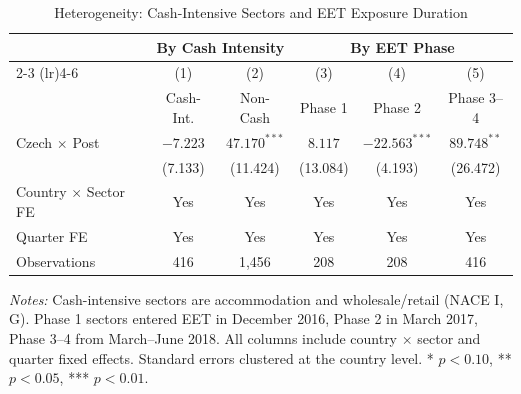 
\begin{table}[H]
\centering
\caption{Heterogeneity: Cash-Intensive Sectors and EET Exposure Duration}
\label{tab:hetero}
\begin{threeparttable}
\begin{tabular}{lccccc}
\toprule
 & \multicolumn{2}{c}{By Cash Intensity} & \multicolumn{3}{c}{By EET Phase} \\
\cmidrule(lr){2-3} \cmidrule(lr){4-6}
 & (1) & (2) & (3) & (4) & (5) \\
 & {Cash-Int.} & {Non-Cash} & {Phase 1} & {Phase 2} & {Phase 3--4} \\
\midrule
Czech $\times$ Post & $-7.223$ & $47.170^{***}$ & $8.117$ & $-22.563^{***}$ & $89.748^{**}$ \\
 & (7.133) & (11.424) & (13.084) & (4.193) & (26.472) \\
\midrule
Country $\times$ Sector FE & Yes & Yes & Yes & Yes & Yes \\
Quarter FE & Yes & Yes & Yes & Yes & Yes \\
Observations & 416 & 1,456 & 208 & 208 & 416 \\
\bottomrule
\end{tabular}
\begin{tablenotes}[flushleft]
\small
\item \textit{Notes:} Cash-intensive sectors are accommodation and wholesale/retail (NACE I, G). Phase 1 sectors entered EET in December 2016, Phase 2 in March 2017, Phase 3--4 from March--June 2018. All columns include country $\times$ sector and quarter fixed effects. Standard errors clustered at the country level. * $p<0.10$, ** $p<0.05$, *** $p<0.01$.
\end{tablenotes}
\end{threeparttable}
\end{table}

